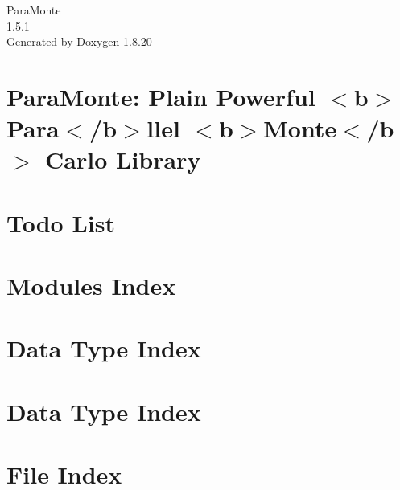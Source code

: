\let\mypdfximage\pdfximage\def\pdfximage{\immediate\mypdfximage}\documentclass[twoside]{book}
\newcommand{\+}{\discretionary{\mbox{\scriptsize$\hookleftarrow$}}{}{}}
\newcommand{\clearemptydoublepage}{%
  \newpage{\pagestyle{empty}\cleardoublepage}%
}
\begin{document}
\hypersetup{pageanchor=false,
             bookmarksnumbered=true,
             pdfencoding=unicode
            }
\begin{titlepage}
\vspace*{7cm}
\begin{center}%
{\Large Para\+Monte \\[1ex]\large 1.\+5.\+1 }\\
\vspace*{1cm}
{\large Generated by Doxygen 1.8.20}\\
\end{center}
\end{titlepage}
\clearemptydoublepage
{}
\tableofcontents
\clearemptydoublepage
{}
\hypersetup{pageanchor=true}

\chapter{Para\+Monte\+: Plain Powerful $<$b$>$Para$<$/b$>$llel $<$b$>$Monte$<$/b$>$ Carlo Library}
\label{index}\hypertarget{index}{}
\chapter{Todo List}
\label{todo}

\chapter{Modules Index}

\chapter{Data Type Index}

\chapter{Data Type Index}

\chapter{File Index}

\end{document}
